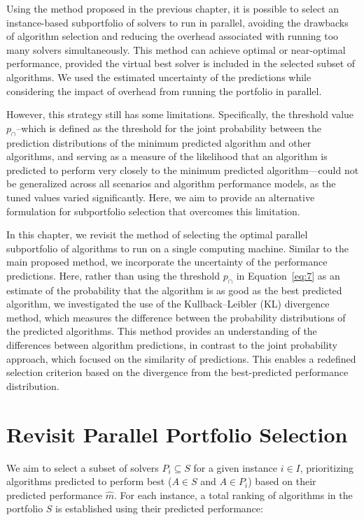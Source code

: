 Using the method proposed in the previous chapter, it is possible to select an instance-based subportfolio of solvers to run in parallel, avoiding the drawbacks of algorithm selection and reducing the overhead associated with running too many solvers simultaneously. This method can achieve optimal or near-optimal performance, provided the virtual best solver is included in the selected subset of algorithms. We used the estimated uncertainty of the predictions while considering the impact of overhead from running the portfolio in parallel. 

However, this strategy still has some limitations. Specifically, the threshold value $p_{\cap}$--which is defined as the threshold for the joint probability between the prediction distributions of the minimum predicted algorithm and other algorithms, and serving as a measure of the likelihood that an algorithm is predicted to perform very closely to the minimum predicted algorithm—could not be generalized across all scenarios and algorithm performance models, as the tuned values varied significantly. Here, we aim to provide an alternative formulation for subportfolio selection that overcomes this limitation.

In this chapter, we revisit the method of selecting the optimal parallel subportfolio of algorithms to run on a single computing machine. Similar to the main proposed method, we incorporate the uncertainty of the performance predictions. Here, rather than using the threshold $p_\cap$ in Equation~\ref{eq:7} as an estimate of the probability that the algorithm is as good as the best predicted algorithm, we investigated the use of the Kullback–Leibler (KL) divergence method, which measures the difference between the probability distributions of the predicted algorithms. This method provides an understanding of the differences between algorithm predictions, in contrast to the joint probability approach, which focused on the similarity of predictions. This enables a redefined selection criterion based on the divergence from the best-predicted performance distribution.



\section{Revisit Parallel Portfolio Selection}

We aim to select a subset of solvers \begin{math} P_i \subseteq S \end{math} for a given instance \(i \in I\), prioritizing algorithms predicted to perform best (\( A \in S \) and \( A \in P_i \)) based on their predicted performance \(\hat{m}\). For each instance, a total ranking of algorithms in the portfolio \(S\) is established using their predicted performance:

